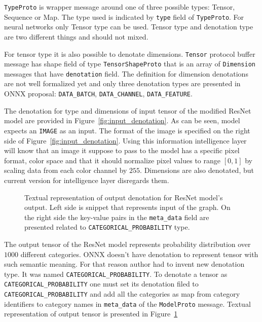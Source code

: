 \documentclass[english, 12pt, a4paper, elec, utf8, online]{aaltothesis}
\begin{document}
\texttt{TypeProto} is wrapper message around one of three possible types: Tensor, Sequence or Map. The type used is indicated by \texttt{type} field of \texttt{TypeProto}. For neural networks only Tensor type can be used. Tensor type and denotation type are two different things and should not mixed.     

For tensor type it is also possible to denotate dimensions. \texttt{Tensor} protocol buffer message has shape field of type \texttt{TensorShapeProto} that is an array of \texttt{Dimension} messages that have \texttt{denotation} field. The definition for dimension denotations are not well formalized yet and only three denotation types are presented in ONNX proposal: \texttt{DATA\_BATCH}, \texttt{DATA\_CHANNEL}, \texttt{DATA\_FEATURE}.  


The denotation for type and dimensions of input tensor of the modified ResNet model are provided in Figure~\ref{fig:input_denotation}. As can be seen, model expects an \texttt{IMAGE} as an input. The format of the image is specified on the right side of Figure~\ref{fig:input_denotation}. Using this information intelligence layer will know that an image it suppose to pass to the model has a specific pixel format, color space and that it should normalize pixel values to range $[0, 1]$ by scaling data from each color channel by $255$. Dimensions are also denotated, but current version for intelligence layer disregards them.    

\begin{figure}[h!]
\centering
{}

\caption{Textual representation of output denotation for ResNet model's output. Left side is snippet that represents input of the graph. On the right side the key-value pairs in the \texttt{meta\_data} field are presented related to \texttt{CATEGORICAL\_PROBABILITY} type.}\label{fig:output_denotation}
\end{figure}

The output tensor of the ResNet model represents probability distribution over $1000$ different categories. ONNX doesn't have denotation to represent tensor with such semantic meaning. For that reason author had to invent new denotation type. It was named  \texttt{CATEGORICAL\_PROBABILITY}. To denotate a tensor as \texttt{CATEGORICAL\_PROBABILITY} one must set its denotation filed to \texttt{CATEGORICAL\_PROBABILITY} and add all the categories as map from category identifiers to category names in \texttt{meta\_data} of the \texttt{ModelProto} message. Textual representation of output tensor is presented in Figure~\ref{fig:output_denotation}        
\end{document}
